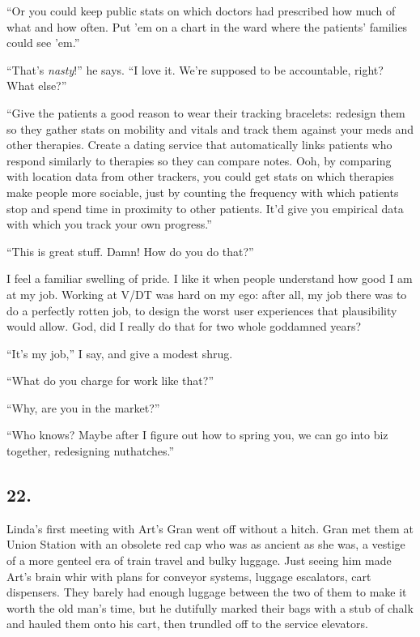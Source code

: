 “Or you could keep public stats on which doctors had prescribed how
much of what and how often. Put ’em on a chart in the ward where
the patients’ families could see ’em.”

“That’s \emph{nasty}!” he says. “I love it. We’re supposed to be
accountable, right? What else?”

“Give the patients a good reason to wear their tracking brace\-lets:
redesign them so they gather stats on mobility and vitals and track
them against your meds and other therapies. Create a dating service
that automatically links patients who respond similarly to
therapies so they can compare notes. Ooh, by comparing with
location data from other trackers, you could get stats on which
therapies make people more sociable, just by counting the frequency
with which patients stop and spend time in proximity to other
patients. It’d give you empirical data with which you track your
own progress.”

“This is great stuff. Damn! How do you do that?”

I feel a familiar swelling of pride. I like it when people
understand how good I am at my job. Working at V/DT was hard on my
ego: after all, my job there was to do a perfectly rotten job, to
design the worst user experiences that plausibility would allow.
God, did I really do that for two whole goddamned years?

“It’s my job,” I say, and give a modest shrug.

“What do you charge for work like that?”

“Why, are you in the market?”

“Who knows? Maybe after I figure out how to spring you, we can go
into biz together, redesigning nuthatches.”

\subsection{22.}

Linda’s first meeting with Art’s Gran went off without a hitch.
Gran met them at Union Station with an obsolete red cap who was as
ancient as she was, a vestige of a more genteel era of train travel
and bulky luggage. Just seeing him made Art’s brain whir with plans
for conveyor systems, luggage escalators, cart dispensers. They
barely had enough luggage between the two of them to make it worth
the old man’s time, but he dutifully marked their bags with a stub
of chalk and hauled them onto his cart, then trundled off to the
service elevators.

